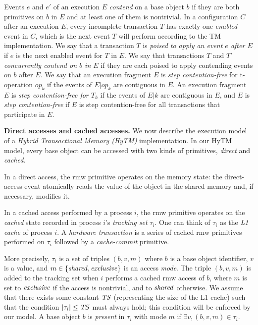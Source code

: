 Events $e$ and $e'$ of an execution $E$  \emph{contend} on a base
object $b$ if they are both primitives on $b$ in $E$ and at least 
one of them is nontrivial.
In a configuration $C$ after an execution $E$, every incomplete transaction $T$  
has exactly one \emph{enabled} event in $C$, 
which is the next event $T$ will perform according to the TM implementation.
We say that a transaction $T$ is \emph{poised to apply an event $e$ after $E$} 
if $e$ is the next enabled event for $T$ in $E$.
We say that transactions $T$ and $T'$ \emph{concurrently contend on $b$ in $E$} 
if they are each poised to apply contending events on $b$ after $E$.
We say that an execution fragment $E$ is \emph{step contention-free} for t-operation $op_k$ if the events of $E|op_k$ 
are contiguous in $E$.
An execution fragment $E$ is \emph{step contention-free for $T_k$} if the events of $E|k$ are contiguous in $E$, and $E$ is \emph{step contention-free} if $E$ is step contention-free for all transactions that participate in $E$.

\vspace{1mm}\noindent\textbf{Direct accesses and cached accesses.}
We  now describe the execution model of a \emph{Hybrid Transactional Memory (HyTM)} implementation.
%
In our HyTM model, every base object can be accessed with two kinds of
primitives, \emph{direct} and \emph{cached}.

In a direct access, the rmw primitive operates on the memory state:
the direct-access event atomically reads the value of the object in
the shared memory and, if necessary, modifies it.

In a cached access performed by a process $i$, the rmw primitive operates on the \emph{cached}
state recorded in process $i$'s \emph{tracking set} $\tau_i$. 
One can think of $\tau_i$ as the \emph{L1 cache} of process $i$.
A \emph{hardware transaction}  is a series of cached rmw primitives performed on $\tau_i$ followed by
a \emph{cache-commit} primitive. 
 
More precisely, $\tau_i$ is a set of triples $(b, v, m)$ where $b$ is a base object identifier, $v$ is a value, 
and $m \in \{\mathit{shared}, \mathit{exclusive}\}$ is an access \emph{mode}. 
The triple $(b, v, m)$ is added to the tracking set when $i$ performs a cached
rmw access of $b$, where $m$ is set to $\mathit{exclusive}$ if the access is
nontrivial, and to $\mathit{shared}$ otherwise.  
We assume that there exists some constant $\mathit{TS}$ (representing the size of the L1 cache)
such that the condition $|\tau_i| \leq \mathit{TS}$ must always hold; this
condition will be enforced by our model.
A base object $b$ is \emph{present} in $\tau_i$ with mode $m$ if $\exists v, (b,v,m) \in \tau_i$.

